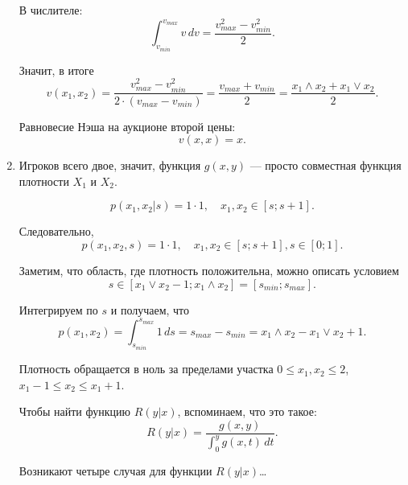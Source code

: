 \begin{enumerate}
В числителе:
\begin{equation}
\int_{v_{min}}^{v_{max}}v \, dv=\frac{v_{max}^{2}-v_{min}^{2}}{2}.
\end{equation}

Значит, в итоге
\begin{equation}
v(x_{1},x_{2})=\frac{v_{max}^{2}-v_{min}^{2}}{2\cdot (v_{max}-v_{min})}=\frac{v_{max}+v_{min}}{2}= \frac{x_{1}\wedge x_{2}+x_{1}\vee x_{2}}{2}.
\end{equation}

Равновесие Нэша на аукционе второй цены:
\begin{equation}
v(x,x)=x.
\end{equation}


\item Игроков всего двое, значит, функция $ g(x,y) $ — просто совместная функция плотности $ X_{1} $ и $ X_{2} $.

\begin{equation}
p(x_{1},x_{2}|s)=1\cdot 1, \quad x_{1},x_{2}\in [s;s+1].
\end{equation}

Следовательно,
\begin{equation}
p(x_{1},x_{2},s)=1\cdot 1, \quad x_{1},x_{2}\in [s;s+1], s\in [0;1].
\end{equation}

Заметим, что область, где плотность положительна, можно описать условием
\begin{equation}
s\in [x_{1}\vee x_{2}-1; x_{1}\wedge x_{2}]=[s_{min};s_{max}].
\end{equation}

Интегрируем по $ s $ и получаем, что
\begin{equation}
p(x_{1},x_{2})=\int_{s_{min}}^{s_{max}} 1 \, ds= s_{max}-s_{min}=x_{1}\wedge x_{2}-x_{1}\vee x_{2}+1.
\end{equation}

Плотность обращается в ноль за пределами участка $ 0\leq x_{1},x_{2}\leq 2 $, $ x_{1}-1\leq x_{2} \leq x_{1}+1 $.

Чтобы найти функцию $ R(y|x) $, вспоминаем, что это такое:
\begin{equation}
R(y|x)=\frac{g(x,y)}{\int_{0}^{y}g(x,t) \, dt}.
\end{equation}

Возникают четыре случая для функции $ R(y|x) $\ldots



\end{enumerate}
